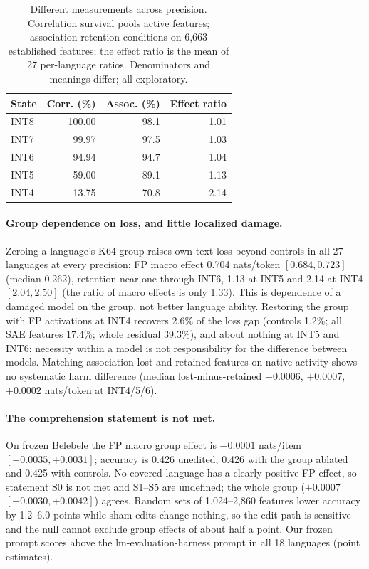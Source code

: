\begin{table}[t]
\centering
\begin{tabular}{lrrr}
\toprule
State & Corr. (\%) & Assoc. (\%) & Effect ratio\\
\midrule
INT8 & 100.00 & 98.1 & 1.01\\
INT7 & 99.97 & 97.5 & 1.03\\
INT6 & 94.94 & 94.7 & 1.04\\
INT5 & 59.00 & 89.1 & 1.13\\
INT4 & 13.75 & 70.8 & 2.14\\
\bottomrule
\end{tabular}
\caption{Different measurements across precision. Correlation survival pools active features; association retention conditions on 6,663 established features; the effect ratio is the mean of 27 per-language ratios. Denominators and meanings differ; all exploratory.}
\label{tab:ladder}
\end{table}

\paragraph{Group dependence on loss, and little localized damage.}
Zeroing a language's K64 group raises own-text loss beyond controls in all 27 languages at every precision: FP macro effect 0.704 nats/token $[0.684,0.723]$ (median 0.262), retention near one through INT6, 1.13 at INT5 and 2.14 at INT4 $[2.04,2.50]$ (the ratio of macro effects is only 1.33). This is dependence of a damaged model on the group, not better language ability. Restoring the group with FP activations at INT4 recovers 2.6\% of the loss gap (controls 1.2\%; all SAE features 17.4\%; whole residual 39.3\%), and about nothing at INT5 and INT6: necessity within a model is not responsibility for the difference between models. Matching association-lost and retained features on native activity shows no systematic harm difference (median lost-minus-retained $+0.0006$, $+0.0007$, $+0.0002$ nats/token at INT4/5/6).

\paragraph{The comprehension statement is not met.}
On frozen Belebele the FP macro group effect is $-0.0001$ nats/item $[-0.0035,+0.0031]$; accuracy is 0.426 unedited, 0.426 with the group ablated and 0.425 with controls. No covered language has a clearly positive FP effect, so statement S0 is not met and S1--S5 are undefined; the whole group ($+0.0007$ $[-0.0030,+0.0042]$) agrees. Random sets of 1,024--2,860 features lower accuracy by 1.2--6.0 points while sham edits change nothing, so the edit path is sensitive and the null cannot exclude group effects of about half a point. Our frozen prompt scores above the lm-evaluation-harness prompt in all 18 languages (point estimates).


